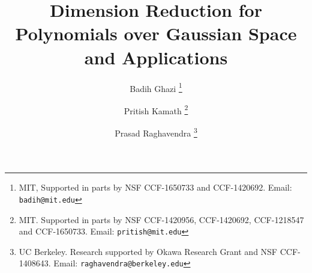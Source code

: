 \documentclass[11pt]{article}
\begin{document}
\title{Dimension Reduction for Polynomials over Gaussian Space\\ and Applications}

\def\authorsize{\normalsize}
\author{
	\authorsize Badih Ghazi \thanks{MIT, Supported in parts by NSF CCF-1650733 and CCF-1420692. Email: \texttt{badih@mit.edu}} \and
	\authorsize Pritish Kamath \thanks{MIT. Supported in parts by NSF CCF-1420956, CCF-1420692, CCF-1218547 and CCF-1650733. Email: \texttt{pritish@mit.edu}} \and
	\authorsize Prasad Raghavendra \thanks{UC Berkeley. Research supported by Okawa Research Grant and NSF CCF-1408643. Email: \texttt{raghavendra@berkeley.edu}}
}

\maketitle
\end{document}
